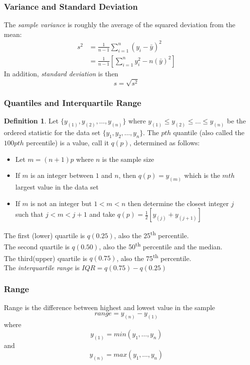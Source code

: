 \documentclass[12pt]{article}
\theoremstyle{definition}
\newtheorem*{defn}{Definition}
\begin{document}
  \subsubsection{Variance and Standard Deviation}
  The \emph{sample variance} is roughly the average of the squared deviation from the mean:
  \begin{align*}
  s^{2} &= \frac{1}{n-1}\sum_{i=1}^{n}(y_{i} - \bar{y})^{2} \\
  &= \frac{1}{n-1}
  \left[
  \sum_{i=1}^{n}y_{i}^{2} - n(\bar{y})^{2}
  \right]
  \end{align*}
  In addition, \emph{standard deviation} is then
  $$s = \sqrt{s^{2}}$$

  \subsubsection{Quantiles and Interquartile Range} \label{iqr}
  \begin{defn}
    Let $\{y_{(1)}, y_{(2)}, \dots, y_{(n)}\}$ where $y_{(1)} \leq y_{(2)} \leq \dots \leq y_{(n)}$ be the ordered statistic for the data set $\{y_1, y_2, \dots, y_n\}$.
    The $pth$ quantile (also called the $100pth$ percentile) is a value, call it $q(p)$, determined as follows:
    \begin{itemize}
    \item Let $m = (n+1)p$ where $n$ is the sample size
    \item If $m$ is an integer between $1$ and $n$, then $q(p) = y_{(m)}$ which is the $mth$ largest value in the data set
    \item If $m$ is not an integer but $1 < m < n$ then determine the closest integer $j$ such that $j < m < j+1$ and take $q(p) = \frac{1}{2}[y_{(j)} + y_{(j+1)}]$
    \end{itemize}
  \end{defn}
  The first (lower) quartile is $q(0.25)$, also the 25\textsuperscript{th} percentile. \\
  The second quartile is $q(0.50)$, also the 50\textsuperscript{th} percentile and the median. \\
  The third(upper) quartile is $q(0.75)$, also the 75\textsuperscript{th} percentile. \\

  The \emph{interquartile range} is $IQR = q(0.75) - q(0.25)$

  \subsubsection{Range}
  Range is the difference between highest and lowest value in the sample
  $$range = y_{(n)} - y_{(1)}$$
  where
  $$y_{(1)} = min(y_{1}, \dots, y_{n})$$
  and
  $$y_{(n)} = max(y_{1}, \dots, y_{n})$$
\end{document}
